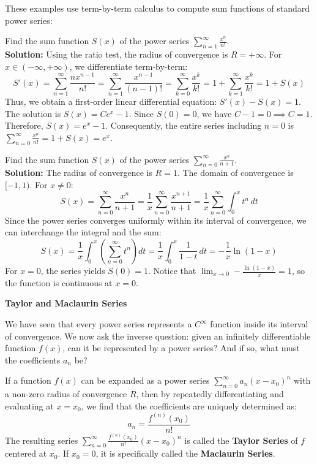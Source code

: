 These examples use term-by-term calculus to compute sum functions of standard power series:

\begin{example}
Find the sum function $S(x)$ of the power series $\sum_{n=1}^{\infty} \frac{x^n}{n!}$.
\\ \textbf{Solution:} Using the ratio test, the radius of convergence is $R = +\infty$. For $x \in (-\infty, +\infty)$, we differentiate term-by-term:
\[ S'(x) = \sum_{n=1}^{\infty} \frac{n x^{n-1}}{n!} = \sum_{n=1}^{\infty} \frac{x^{n-1}}{(n-1)!} = \sum_{k=0}^{\infty} \frac{x^k}{k!} = 1 + \sum_{k=1}^{\infty} \frac{x^k}{k!} = 1 + S(x) \]
Thus, we obtain a first-order linear differential equation: $S'(x) - S(x) = 1$. The solution is $S(x) = C e^x - 1$.
Since $S(0) = 0$, we have $C - 1 = 0 \implies C = 1$. Therefore, $S(x) = e^x - 1$.
Consequently, the entire series including $n=0$ is $\sum_{n=0}^{\infty} \frac{x^n}{n!} = 1 + S(x) = e^x$.
\end{example}

\begin{example}
Find the sum function $S(x)$ of the power series $\sum_{n=0}^{\infty} \frac{x^n}{n+1}$.
\\ \textbf{Solution:} The radius of convergence is $R = 1$. The domain of convergence is $[-1, 1)$.
For $x \neq 0$:
\[ S(x) = \sum_{n=0}^{\infty} \frac{x^n}{n+1} = \frac{1}{x} \sum_{n=0}^{\infty} \frac{x^{n+1}}{n+1} = \frac{1}{x} \sum_{n=0}^{\infty} \int_0^x t^n \, dt \]
Since the power series converges uniformly within its interval of convergence, we can interchange the integral and the sum:
\[ S(x) = \frac{1}{x} \int_0^x \left(\sum_{n=0}^{\infty} t^n\right) dt = \frac{1}{x} \int_0^x \frac{1}{1-t} \, dt = -\frac{1}{x} \ln(1-x) \]
For $x = 0$, the series yields $S(0) = 1$. Notice that $\lim_{x \to 0} -\frac{\ln(1-x)}{x} = 1$, so the function is continuous at $x = 0$.
\end{example}

\textbf{Taylor and Maclaurin Series}

We have seen that every power series represents a $C^\infty$ function inside its interval of convergence. We now ask the inverse question: given an infinitely differentiable function $f(x)$, can it be represented by a power series? And if so, what must the coefficients $a_n$ be?


\begin{theorem}
If a function $f(x)$ can be expanded as a power series $\sum_{n=0}^{\infty} a_n (x-x_0)^n$ with a non-zero radius of convergence $R$, then by repeatedly differentiating and evaluating at $x=x_0$, we find that the coefficients are uniquely determined as:
\[ a_n = \frac{f^{(n)}(x_0)}{n!} \]
The resulting series $\sum_{n=0}^{\infty} \frac{f^{(n)}(x_0)}{n!} (x-x_0)^n$ is called the \textbf{Taylor Series} of $f$ centered at $x_0$. If $x_0=0$, it is specifically called the \textbf{Maclaurin Series}.
\end{theorem}

